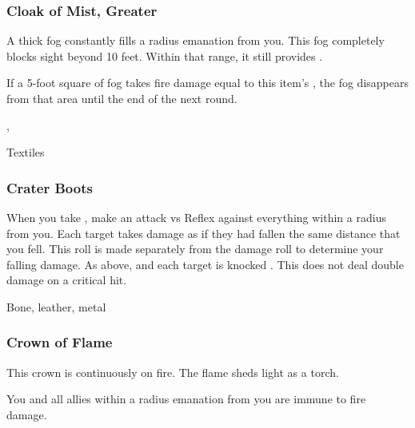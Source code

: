 \lowercase{\hypertarget{item:Cloak of Mist, Greater}{}}\label{item:Cloak of Mist, Greater}
\hypertarget{item:Cloak of Mist, Greater}{\subsubsection{Cloak of Mist, Greater\hfill{}}}

A thick fog constantly fills a \areamed radius emanation from you.
This fog completely blocks sight beyond 10 feet.
Within that range, it still provides \concealment.

If a 5-foot square of fog takes fire damage equal to this item's , the fog disappears from that area until the end of the next round.



 , 


 Textiles


\lowercase{\hypertarget{item:Crater Boots}{}}\label{item:Crater Boots}
\hypertarget{item:Crater Boots}{\subsubsection{Crater Boots\hfill{}}}

When you take , make an attack vs Reflex against everything within a \areasmall radius from you.
\hit Each target takes damage as if they had fallen the same distance that you fell.
This roll is made separately from the damage roll to determine your falling damage.
\crit As above, and each target is knocked .
This does not deal double damage on a critical hit.



 Bone, leather, metal


\lowercase{\hypertarget{item:Crown of Flame}{}}\label{item:Crown of Flame}
\hypertarget{item:Crown of Flame}{\subsubsection{Crown of Flame\hfill{}}}

This crown is continuously on fire.
The flame sheds light as a torch.

You and all allies within a \arealarge radius emanation from you are immune to fire damage.



